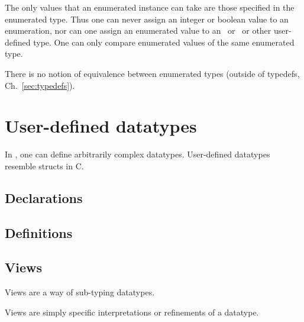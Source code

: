 The only values that an enumerated instance can take are 
those specified in the enumerated type.  
Thus one can never assign an integer or boolean value to an enumeration, 
nor can one assign an enumerated value to an \int\ or \bool\ or
other user-defined type.  
One can only compare enumerated values of the same enumerated type.  

There is no notion of equivalence between enumerated types 
(outside of typedefs, Ch.~\ref{sec:typedefs}).  

\section{User-defined datatypes}
\label{sec:datatype:userdef}

In \hac, one can define arbitrarily complex datatypes.  
User-defined datatypes resemble structs in C.  

\subsection{Declarations}
\label{sec:datatype:userdef:declaration}

\subsection{Definitions}
\label{sec:datatype:userdef:definition}

\subsection{Views}
\label{sec:datatype:userdef:views}

Views are a way of sub-typing datatypes.  

Views are simply specific interpretations or refinements of a datatype.  




